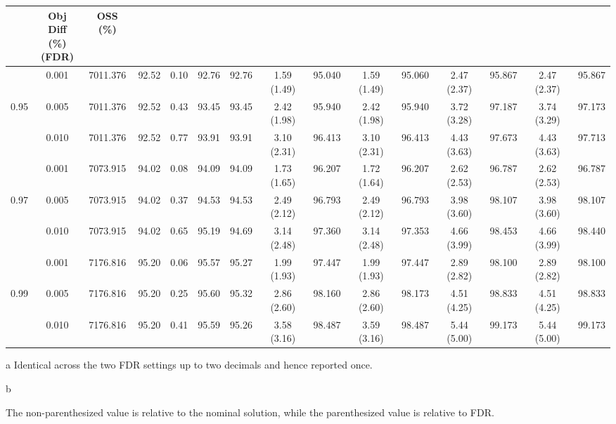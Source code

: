 \documentclass[opre,sglanonrev]{informs4}
\begin{document}
{\begin{table}[!hbtp]
\begin{threeparttable}
{\begin{tabular}{cc|cc|ccc|cc|cc|cc|cc}
& \makecell{Obj \\Diff (\%)\\ (FDR)\tnote{b}} & OSS (\%) \\
\midrule
& 0.001 & 7011.376 & 92.52 & 0.10 & 92.76 & 92.76 & 1.59 (1.49) & 95.040 & 1.59 (1.49) & 95.060 & 2.47 (2.37) & 95.867 & 2.47 (2.37) & 95.867 \\
0.95 & 0.005 & 7011.376 & 92.52 & 0.43 & 93.45 & 93.45 & 2.42 (1.98) & 95.940 & 2.42 (1.98) & 95.940 & 3.72 (3.28) & 97.187 & 3.74 (3.29) & 97.173 \\
 & 0.010 & 7011.376 & 92.52 & 0.77 & 93.91 & 93.91 & 3.10 (2.31) & 96.413 & 3.10 (2.31) & 96.413 & 4.43 (3.63) & 97.673 & 4.43 (3.63) & 97.713 \\
\midrule
 & 0.001 & 7073.915 & 94.02 & 0.08 & 94.09 & 94.09 & 1.73 (1.65) & 96.207 & 1.72 (1.64) & 96.207 & 2.62 (2.53) & 96.787 & 2.62 (2.53) & 96.787 \\
0.97 & 0.005 & 7073.915 & 94.02 & 0.37 & 94.53 & 94.53 & 2.49 (2.12) & 96.793 & 2.49 (2.12) & 96.793 & 3.98 (3.60) & 98.107 & 3.98 (3.60) & 98.107 \\
 & 0.010 & 7073.915 & 94.02 & 0.65 & 95.19 & 94.69 & 3.14 (2.48) & 97.360 & 3.14 (2.48) & 97.353 & 4.66 (3.99) & 98.453 & 4.66 (3.99) & 98.440 \\
\midrule
& 0.001 & 7176.816 & 95.20 & 0.06 & 95.57 & 95.27 & 1.99 (1.93) & 97.447 & 1.99 (1.93) & 97.447 & 2.89 (2.82) & 98.100 & 2.89 (2.82) & 98.100 \\
0.99 & 0.005 & 7176.816 & 95.20 & 0.25 & 95.60 & 95.32 & 2.86 (2.60) & 98.160 & 2.86 (2.60) & 98.173 & 4.51 (4.25) & 98.833 & 4.51 (4.25) & 98.833 \\
 & 0.010 & 7176.816 & 95.20 & 0.41 & 95.59 & 95.26 & 3.58 (3.16) & 98.487 & 3.59 (3.16) & 98.487 & 5.44 (5.00) & 99.173 & 5.44 (5.00) & 99.173 \\
\bottomrule
\end{tabular}%
}
\begin{tablenotes}
\scriptsize
\item[a] Identical across the two FDR settings up to two decimals and hence reported once.
\item[b] \parbox[t]{0.95\textwidth}{%
The non-parenthesized value is relative to the nominal solution, while the parenthesized value is relative to FDR.}
\end{tablenotes}
\end{threeparttable}
\end{table}

}
\end{document}
